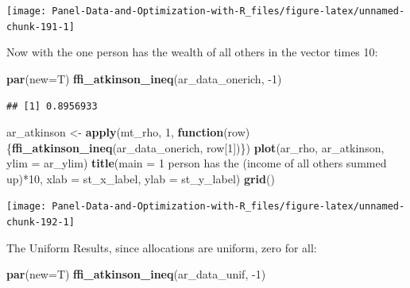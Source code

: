 \documentclass[
]{book}
\newenvironment{Shaded}{\begin{snugshade}}{\end{snugshade}}
\newcommand{\ControlFlowTok}[1]{\textcolor[rgb]{0.13,0.29,0.53}{\textbf{#1}}}
\newcommand{\DataTypeTok}[1]{\textcolor[rgb]{0.13,0.29,0.53}{#1}}
\newcommand{\DecValTok}[1]{\textcolor[rgb]{0.00,0.00,0.81}{#1}}
\newcommand{\KeywordTok}[1]{\textcolor[rgb]{0.13,0.29,0.53}{\textbf{#1}}}
\newcommand{\NormalTok}[1]{#1}
\newcommand{\StringTok}[1]{\textcolor[rgb]{0.31,0.60,0.02}{#1}}
\begin{document}
\begin{center}\texttt{[image: Panel-Data-and-Optimization-with-R\_files/figure-latex/unnamed-chunk-191-1]} \end{center}

Now with the one person has the wealth of all others in the vector times 10:

\begin{Shaded}
\begin{Highlighting}[]
\KeywordTok{par}\NormalTok{(}\DataTypeTok{new=}\NormalTok{T)}
\KeywordTok{ffi\_atkinson\_ineq}\NormalTok{(ar\_data\_onerich, }\DecValTok{{-}1}\NormalTok{)}
\end{Highlighting}
\end{Shaded}

\begin{verbatim}
## [1] 0.8956933
\end{verbatim}

\begin{Shaded}
\begin{Highlighting}[]
\NormalTok{ar\_atkinson \textless{}{-}}\StringTok{ }\KeywordTok{apply}\NormalTok{(mt\_rho, }\DecValTok{1}\NormalTok{, }\ControlFlowTok{function}\NormalTok{(row)\{}\KeywordTok{ffi\_atkinson\_ineq}\NormalTok{(ar\_data\_onerich, row[}\DecValTok{1}\NormalTok{])\})}
\KeywordTok{plot}\NormalTok{(ar\_rho, ar\_atkinson, }\DataTypeTok{ylim =}\NormalTok{ ar\_ylim)}
\KeywordTok{title}\NormalTok{(}\DataTypeTok{main =} \StringTok{\textquotesingle{}1 person has the (income of all others summed up)*10\textquotesingle{}}\NormalTok{, }\DataTypeTok{xlab =}\NormalTok{ st\_x\_label, }\DataTypeTok{ylab =}\NormalTok{ st\_y\_label)}
\KeywordTok{grid}\NormalTok{()}
\end{Highlighting}
\end{Shaded}

\begin{center}\texttt{[image: Panel-Data-and-Optimization-with-R\_files/figure-latex/unnamed-chunk-192-1]} \end{center}

The Uniform Results, since allocations are uniform, zero for all:

\begin{Shaded}
\begin{Highlighting}[]
\KeywordTok{par}\NormalTok{(}\DataTypeTok{new=}\NormalTok{T)}
\KeywordTok{ffi\_atkinson\_ineq}\NormalTok{(ar\_data\_unif, }\DecValTok{{-}1}\NormalTok{)}
\end{Highlighting}
\end{Shaded}
\end{document}
